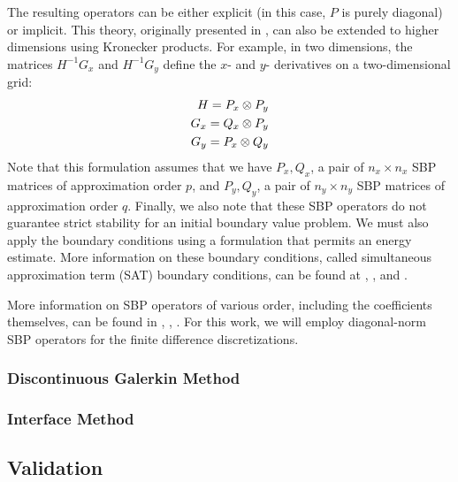 The resulting operators can be either explicit (in this case, $P$ is purely diagonal) or implicit.
This theory, originally presented in \cite{strand1994summation}, can also be extended to higher
dimensions using Kronecker products.  For example, in two dimensions, the matrices $H^{-1} G_x$
and $H^{-1} G_y$ define the $x$- and $y$- derivatives on a two-dimensional grid:
\begin{align}
H = P_{x} \otimes P_{y} \notag \\
G_{x} = Q_{x} \otimes P_{y} \notag \\
G_{y} = P_{x} \otimes Q_{y} \notag
\end{align}
Note that this formulation assumes that we have ${P_{x},Q_{x}}$, a pair of $n_{x} \times n_{x}$ SBP
matrices of approximation order $p$, and ${P_{y},Q_{y}}$, a pair of $n_{y} \times n_{y}$ SBP matrices
of approximation order $q$. Finally, we also note that these SBP operators do not guarantee strict
stability for an initial boundary value problem. We must also apply the boundary conditions using a
formulation that permits an energy estimate. More information on these boundary conditions, called
simultaneous approximation term (SAT) boundary conditions, can be found at \cite{svard2007stable},
\cite{svard2008stable}, and \cite{bodony2010accuracy}.

More information on SBP operators of various order, including the coefficients themselves, can be found
in \cite{strand1994summation}, \cite{carpenter1993time}, \cite{mattsson2004stable}. For this work,
we will employ diagonal-norm SBP operators for the finite difference discretizations.

\subsubsection{Discontinuous Galerkin Method}

\subsubsection{Interface Method}

\subsection{Validation}

